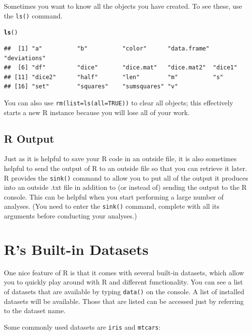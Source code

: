 \documentclass[12pt]{article}\usepackage[]{graphicx}\usepackage[]{color}
\makeatletter
\newcommand{\hlstd}[1]{\textcolor[rgb]{0.345,0.345,0.345}{#1}}%
\newcommand{\hlkwd}[1]{\textcolor[rgb]{0.737,0.353,0.396}{\textbf{#1}}}%
\newenvironment{kframe}{%
 \def\at@end@of@kframe{}%
 \ifinner\ifhmode%
  \def\at@end@of@kframe{\end{minipage}}%
  \begin{minipage}{\columnwidth}%
 \fi\fi%
 \def\FrameCommand##1{\hskip\@totalleftmargin \hskip-\fboxsep
 \colorbox{shadecolor}{##1}\hskip-\fboxsep
     \hskip-\linewidth \hskip-\@totalleftmargin \hskip\columnwidth}%
 \MakeFramed {\advance\hsize-\width
   \@totalleftmargin\z@ \linewidth\hsize
   \@setminipage}}%
 {\par\unskip\endMakeFramed%
 \at@end@of@kframe}
\newenvironment{knitrout}{}{} %
\makeatother
\begin{document}
Sometimes you want to know all the objects you have created. To see these, use the \texttt{ls()} command.
\begin{knitrout}
\color{fgcolor}\begin{kframe}
\begin{alltt}
\hlkwd{ls}\hlstd{()}
\end{alltt}
\begin{verbatim}
##  [1] "a"          "b"          "color"      "data.frame" "deviations"
##  [6] "df"         "dice"       "dice.mat"   "dice.mat2"  "dice1"     
## [11] "dice2"      "half"       "len"        "m"          "s"         
## [16] "set"        "squares"    "sumsquares" "v"
\end{verbatim}
\end{kframe}
\end{knitrout}
You can also use \texttt{rm(list=ls(all=TRUE))} to clear all objects; this effectively starts a new R instance because you will lose all of your work.

\subsection{R Output}
Just as it is helpful to save your R code in an outside file, it is also sometimes helpful to send the output of R to an outside file so that you can retrieve it later. R provides the \texttt{sink()} command to allow you to put all of the output it produces into an outside .txt file in addition to (or instead of) sending the output to the R console. This can be helpful when you start performing a large number of analyses. (You need to enter the \texttt{sink()} command, complete with all its arguments before conducting your analyses.)

\section{R's Built-in Datasets}\label{sec:datasets}
One nice feature of R is that it comes with several built-in datasets, which allow you to quickly play around with R and different functionality. You can see a list of datasets that are available by typing \texttt{data()} on the console. A list of installed datasets will be available. Those that are listed can be accessed just by referring to the dataset name.

Some commonly used datasets are \texttt{iris} and \texttt{mtcars}:
\end{document}
